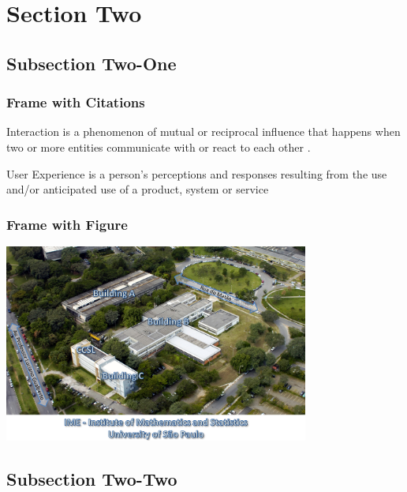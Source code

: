 \expandafter\documentclass\expandafter[table, usenames, svgnames, dvipsnames, \classopts]{beamer}
\begin{document}
\section{Section Two}

\subsection{Subsection Two-One}

\begin{frame} 
	\frametitle{\textbf{Frame with Citations}}
	
	\begin{outline}
		\1 Interaction is a phenomenon of mutual or reciprocal influence that happens when two or more entities communicate with or react to each other \cite{Wagner1994}.
		
		\vspace{1em}
		
		\1 User Experience is a person's perceptions and responses resulting from the use and/or anticipated use of a product, system or service \cite{ISO2010}
	\end{outline}	

\end{frame}

\begin{frame} 
	\frametitle{\textbf{Frame with Figure}}

	\begin{center}
		\includegraphics[height=6.5cm]{ime-usp}
	\end{center}

\end{frame}

\subsection{Subsection Two-Two}
\end{document}
